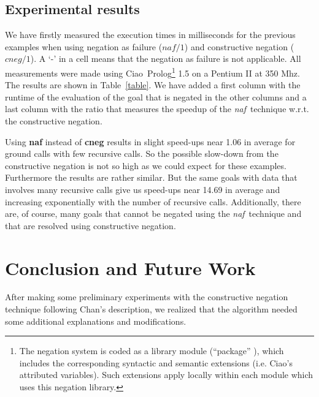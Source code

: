 \documentclass{llncs}
\newcommand{\naf}{{\em naf}}\newcommand{\viejo}[1]{}
\newcommand{\ciao}{Ciao}
\begin{document}

\subsection{Experimental results}
\label{results}

We have firstly measured the execution times in milliseconds for the
previous examples when using negation as failure ($naf/1$) and
constructive negation ($cneg/1$). A `-' in a cell means that the
negation as failure is not applicable. All measurements were made
using \ciao\ Prolog\footnote{The negation system is coded as a library
  module (``package'' \cite{ciao-modules-cl2000}), which includes the
  corresponding syntactic and semantic extensions (i.e. Ciao's
  attributed variables). Such extensions apply locally within each
  module which uses this negation library.} 1.5 on a Pentium II at 350
Mhz. The results are shown in Table~\ref{table}. We have added a first
column with the runtime of the evaluation of the goal that is negated
in the other columns and a last column with the ratio that measures the
speedup of the \naf\ technique w.r.t. the constructive negation.

Using {\bf naf} instead of {\bf cneg} results in slight speed-ups near
1.06 in average for ground calls with few recursive calls. So the
possible slow-down from the constructive negation is not so high as we
could expect for these examples. Furthermore the results are rather
similar. But the same goals with data that involves many recursive
calls give us speed-ups near 14.69 in average and increasing
exponentially with the number of recursive calls. Additionally, there
are, of course, many goals that cannot be negated using the \naf\
technique and that are resolved using constructive negation. 

 


\vspace{-1em}
\section{Conclusion and Future Work}
\label{conclusion}
\vspace{-1em}
After making some preliminary experiments with the constructive 
negation technique  following Chan's description, we realized that the
algorithm needed some additional explanations and modifications.
\end{document}
